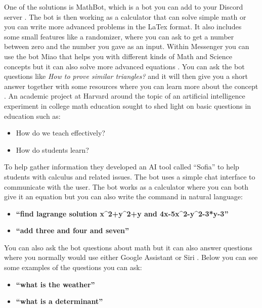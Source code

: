 \noindent
One of the solutions is MathBot, which is a bot you can add to your Discord server \cite{MathBotBots}. The bot is then working as a calculator that can solve simple math or you can write more advanced problems in the LaTex format. It also includes some small features like a randomizer, where you can ask to get a number between zero and the number you gave as an input. 
\newline\newline
Within Messenger you can use the bot Miao that helps you with different kinds of Math and Science concepts but it can also solve more advanced equations \cite{MiaoAcademy}. You can ask the bot questions like \textit{How to prove similar triangles?} and it will then give you a short answer together with some resources where you can learn more about the concept \cite{MiaoAcademy}.
\newline\newline
An academic project at Harvard \cite{KnillAnEducation} around the topic of an artificial intelligence experiment in college math education sought to shed light on basic questions in education such as:
\begin{itemize}
    \item How do we teach effectively?
    \item How do students learn?
\end{itemize}
\noindent
To help gather information they developed an AI tool called \enquote{Sofia} to help students with calculus and related issues. The bot uses a simple chat interface to communicate with the user. The bot works as a calculator where you can both give it an equation but you can also write the command in natural language:
\begin{itemize}
    \item \textbf{{\footnotesize \enquote{find lagrange solution x\^{}2+y\^{}2+y and 4x-5x\^{}2-y\^{}2-3*y-3}}}
    \item \textbf{{\footnotesize \enquote{add three and four and seven}}}
\end{itemize}
\noindent
You can also ask the bot questions about math but it can also answer questions where you normally would use either Google Assistant or Siri \cite{GoogleGoogle}\cite{SiriApple}. Below you can see some examples of the questions you can ask:
\begin{itemize}
    \item \textbf{{\footnotesize \enquote{what is the weather}}}
    \item \textbf{{\footnotesize \enquote{what is a determinant}}}
\end{itemize}

